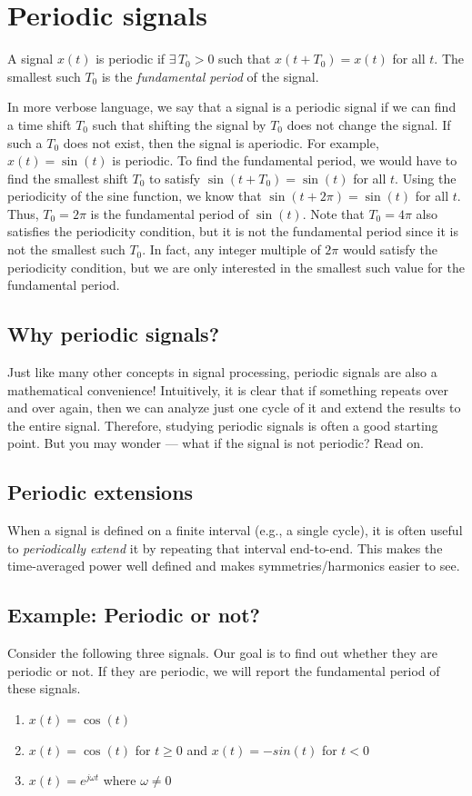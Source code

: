 \documentclass{ee102_notes}
\begin{document}
\section{Periodic signals}
\begin{definition}
    A signal $x(t)$ is periodic if $\exists\,T_0>0$ such that $x(t+T_0)=x(t)$ for all $t$. The smallest such $T_0$ is the \emph{fundamental period} of the signal.
\end{definition}
In more verbose language, we say that a signal is a periodic signal if we can find a time shift $T_0$ such that shifting the signal by $T_0$ does not change the signal. If such a $T_0$ does not exist, then the signal is aperiodic. For example, $x(t)=\sin(t)$ is periodic. To find the fundamental period, we would have to find the smallest shift $T_0$ to satisfy $\sin(t+T_0)=\sin(t)$ for all $t$. Using the periodicity of the sine function, we know that $\sin(t+2\pi)=\sin(t)$ for all $t$. Thus, $T_0=2\pi$ is the fundamental period of $\sin(t)$. Note that $T_0=4\pi$ also satisfies the periodicity condition, but it is not the fundamental period since it is not the smallest such $T_0$. In fact, any integer multiple of $2\pi$ would satisfy the periodicity condition, but we are only interested in the smallest such value for the fundamental period. 

\subsection{Why periodic signals?} Just like many other concepts in signal processing, periodic signals are also a mathematical convenience! Intuitively, it is clear that if something repeats over and over again, then we can analyze just one cycle of it and extend the results to the entire signal. Therefore, studying periodic signals is often a good starting point. But you may wonder --- what if the signal is not periodic? Read on.

\subsection{Periodic extensions} 
When a signal is defined on a finite interval (e.g., a single cycle), it is often useful to \emph{periodically extend} it by repeating that interval end-to-end. This makes the time-averaged power well defined and makes symmetries/harmonics easier to see. 

\subsection{Example: Periodic or not?}
Consider the following three signals. Our goal is to find out whether they are periodic or not. If they are periodic, we will report the fundamental period of these signals.
\begin{enumerate}
    \item $x(t) = \cos(t)$
    \item $x(t) = \cos(t)$ for $ t \geq 0$ and $x(t) = -sin(t) $ for $t < 0$
    \item $x(t) = e^{j\omega t}$ where $\omega \neq 0$
\end{enumerate}
\end{document}
